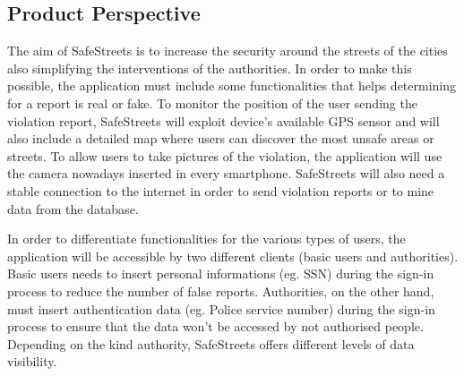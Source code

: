 \subsection{Product Perspective}
The aim of SafeStreets is to increase the security around the streets of the cities also simplifying the interventions of the authorities. \newline
In order to make this possible, the application must include some functionalities that helps determining for a report is real or fake. \newline
To monitor the position of the user sending the violation report, SafeStreets will exploit device’s available GPS sensor and will also include a detailed map where users can discover the most unsafe areas or streets. \newline
To allow users to take pictures of the violation, the application will use the camera nowadays inserted in every smartphone. \newline
SafeStreets will also need a stable connection to the internet in order to send violation reports or to mine data from the database. \newline\par
In order to differentiate functionalities for the various types of users, the application will be accessible by two different clients (basic users and authorities). \newline
Basic users needs to insert personal informations (eg. SSN) during the sign-in process to reduce the number of false reports. \newline
Authorities, on the other hand, must insert authentication data (eg. Police service number) during the sign-in process to ensure that the data won’t be accessed by not authorised people. \newline
Depending on the kind authority, SafeStreets offers different levels of data visibility.

\newpage

